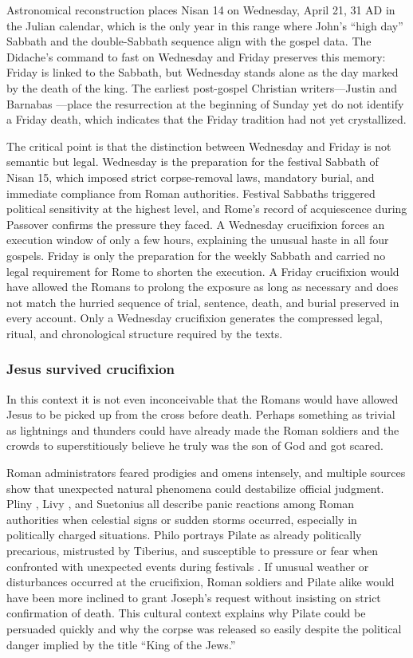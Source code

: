 Astronomical reconstruction places Nisan 14 on Wednesday, April 21, 31 AD in the Julian calendar, which is the only year in this range where John's ``high day'' Sabbath and the double-Sabbath sequence align with the gospel data.
The Didache's command to fast on Wednesday and Friday \cite[8.1]{didache} preserves this memory: Friday is linked to the Sabbath, but Wednesday stands alone as the day marked by the death of the king.
The earliest post-gospel Christian writers---Justin \cite{justinmartyr:apology} and Barnabas \cite{barnabas:epistle}---place the resurrection at the beginning of Sunday yet do not identify a Friday death, which indicates that the Friday tradition had not yet crystallized.

The critical point is that the distinction between Wednesday and Friday is not semantic but legal.
Wednesday is the preparation for the festival Sabbath of Nisan 15, which imposed strict corpse-removal laws, mandatory burial, and immediate compliance from Roman authorities.
Festival Sabbaths triggered political sensitivity at the highest level, and Rome's record of acquiescence during Passover confirms the pressure they faced.
A Wednesday crucifixion forces an execution window of only a few hours, explaining the unusual haste in all four gospels.
Friday is only the preparation for the weekly Sabbath and carried no legal requirement for Rome to shorten the execution.
A Friday crucifixion would have allowed the Romans to prolong the exposure as long as necessary and does not match the hurried sequence of trial, sentence, death, and burial preserved in every account.
Only a Wednesday crucifixion generates the compressed legal, ritual, and chronological structure required by the texts.
\subsubsection{Jesus survived crucifixion}\label{subsubsec:jesus-survived-crucifixion}
In this context it is not even inconceivable that the Romans would have allowed Jesus to be picked up from the cross before death.
Perhaps something as trivial as lightnings and thunders could have already made the Roman soldiers and the crowds to superstitiously believe he truly was the son of God and got scared.

Roman administrators feared prodigies and omens intensely, and multiple sources show that unexpected natural phenomena could destabilize official judgment.
Pliny \cite{pliny:nh}, Livy \cite{livy:aburbe}, and Suetonius \cite{suetonius:caesars} all describe panic reactions among Roman authorities when celestial signs or sudden storms occurred, especially in politically charged situations.
Philo portrays Pilate as already politically precarious, mistrusted by Tiberius, and susceptible to pressure or fear when confronted with unexpected events during festivals \cite[299--305]{philo:legatio}.
If unusual weather or disturbances occurred at the crucifixion, Roman soldiers and Pilate alike would have been more inclined to grant Joseph's request without insisting on strict confirmation of death.
This cultural context explains why Pilate could be persuaded quickly and why the corpse was released so easily despite the political danger implied by the title ``King of the Jews.''

